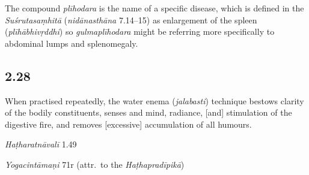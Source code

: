 \begin{ekdosis}
\begin{philcomm}[hp02_027]
\begin{versinnote}
\end{versinnote}

The compound \emph{plīhodara} is the name of a specific disease, which is defined in the \emph{Suśrutasaṃhitā} (\emph{nidānasthāna} 7.14–15) as enlargement of the spleen (\emph{plīhābhivṛddhi}) so \emph{gulmaplīhodara} might be referring more specifically to abdominal lumps and splenomegaly.
\end{philcomm}

\subsection*{2.28}
\begin{translation}[hp02_028]
When practised repeatedly, the water enema (\emph{jalabasti}) technique bestows clarity of the bodily constituents, senses and mind, radiance, [and] stimulation of the digestive fire, and removes [excessive] accumulation of all humours.
\end{translation}


\begin{testimonia}[hp02_028]
\emph{Haṭharatnāvalī} 1.49 

\begin{versinnote}
\end{versinnote}

\emph{Yogacintāmaṇi} 71r (attr.~to the \emph{Haṭhapradīpikā})

\begin{versinnote}
\end{versinnote}


\end{testimonia}
\end{ekdosis}

